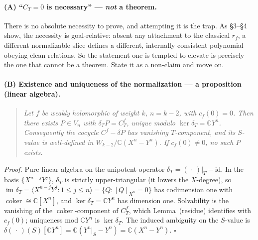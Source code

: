 \documentclass[11pt]{article}
\newcommand{\CC}{\mathbb{C}}
\newcommand{\Vn}{V_n}
\DeclareMathOperator{\im}{im}
\DeclareMathOperator{\coker}{coker}
\begin{document}
\paragraph{(A) ``$C_T = 0$ is necessary'' --- \emph{not} a theorem.}
There is no absolute necessity to prove, and attempting it is the trap.
As \S3--\S4 show, the necessity is goal-relative: absent any attachment to
the classical $r_f$, a different normalizable slice defines a different,
internally consistent polynomial obeying clean relations. So the
statement one is tempted to elevate is precisely the one that cannot be a
theorem. State it as a non-claim and move on.

\paragraph{(B) Existence and uniqueness of the normalization --- a
proposition (linear algebra).}
\begin{quote}\itshape
Let $f$ be weakly holomorphic of weight $k$, $n = k-2$, with
$c_f(0) = 0$. Then there exists $P \in \Vn$ with $\delta_T P = C^f_T$,
unique modulo $\ker\delta_T = \CC Y^n$. Consequently the cocycle
$C^f - \delta P$ has vanishing $T$-component, and its $S$-value is
well-defined in $W_{k-2}/\CC(X^n - Y^n)$. If $c_f(0) \neq 0$, no such $P$
exists.
\end{quote}
\noindent\emph{Proof.} Pure linear algebra on the unipotent operator
$\delta_T = (\,\cdot\,)|_T - \mathrm{id}$. In the basis $\{X^{n-j}Y^j\}$,
$\delta_T$ is strictly upper-triangular (it lowers the $X$-degree),
so $\im\delta_T = \langle X^{n-j}Y^j : 1 \le j \le n\rangle
= \{Q : [Q]_{X^n} = 0\}$ has codimension one
with $\coker \cong \CC[X^n]$, and $\ker\delta_T = \CC Y^n$ has dimension
one. Solvability is the vanishing of the $\coker$-component of $C^f_T$,
which Lemma~(residue) identifies with $c_f(0)$; uniqueness mod $\CC Y^n$
is $\ker\delta_T$. The induced ambiguity on the $S$-value is
$\delta(\,\cdot\,)(S)[\CC Y^n] = \CC(Y^n|_S - Y^n) = \CC(X^n - Y^n)$.
\hfill$\square$
\end{document}
